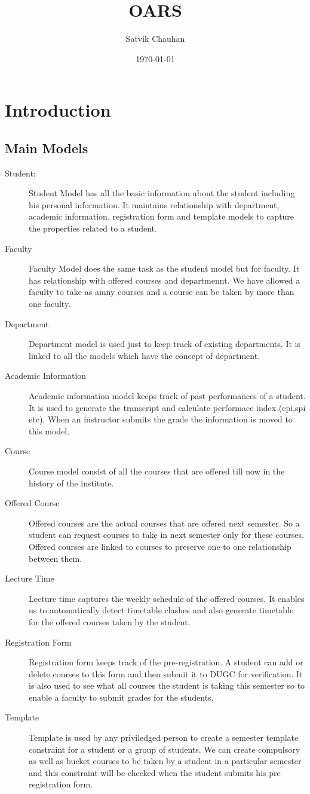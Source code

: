\documentclass[letterpaper,12pt]{article}
\title{OARS}
\author{Satvik Chauhan}
\date{{\small \today}}
\begin{document}
\maketitle
\section{Introduction}


\subsection{Main Models}
\begin{description}
\item[Student:]
Student Model has all the basic information about the student including his
personal information. It maintains relationship with department, academic
information, registration form and template models to capture the properties
related to a student.
\item[Faculty]
Faculty Model does the same task as the student model but for faculty. It has
relationship with offered courses and departmennt. We have allowed a faculty
to take as amny courses and a course can be taken by more than one faculty.
\item[Department]
Department model is used just to keep track of existing departments. It is
linked to all the models which have the concept of department.
\item[Academic Information]
Academic information model keeps track of past performances of a student. It
is used to generate the transcript and calculate performace index (cpi,spi
etc). When an instructor submits the grade the information is moved to this
model.
\item[Course]
Course model consist of all the courses that are offered till now in the
history of the institute.
\item[Offered Course]
Offered courses are the actual courses that are offered next semester. So a
student can request courses to take in next semester only for these
courses. Offered courses are linked to courses to preserve one to one
relationship between them.
\item[Lecture Time]
Lecture time captures the weekly schedule of the offered courses. It enables
us to automatically detect timetable clashes and also generate timetable
for the offered courses taken by the student.
\item[Registration Form]
Registration form keeps track of the pre-registration. A student can add or
delete courses to this form and then submit it to DUGC for verification. It is
also used to see what all courses the student is taking this semester so to
enable a faculty to submit grades for the students.
\item[Template]
Template is used by any priviledged person to create a semester template
constraint for a student or a group of students. We can create compulsory as
well as bucket courses to be taken by a student in a particular semester and
this constraint will be checked when the student submits his pre registration
form.
\end{description}
\end{document}
